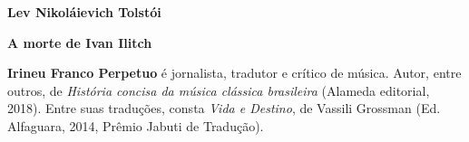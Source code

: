 \textbf{Lev Nikoláievich Tolstói} \lipsum[1]

\textbf{A morte de Ivan Ilitch} \lipsum[2]

\textbf{Irineu Franco Perpetuo} é jornalista, tradutor e crítico de música. Autor, entre outros, de \textit{História concisa da música clássica brasileira} (Alameda editorial, 2018). Entre suas traduções, consta \textit{Vida e Destino}, de Vassili Grossman (Ed. Alfaguara, 2014, Prêmio Jabuti de Tradução).







